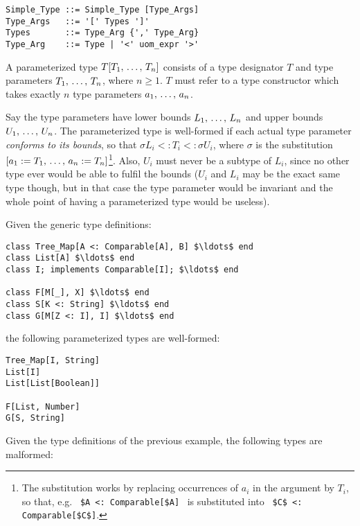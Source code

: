 \syntax\begin{lstlisting}
Simple_Type ::= Simple_Type [Type_Args]
Type_Args   ::= '[' Types ']'
Types       ::= Type_Arg {',' Type_Arg}
Type_Arg    ::= Type | '<' uom_expr '>'
\end{lstlisting}

A parameterized type $T[T_1 ,\, \ldots ,\, T_n]$ consists of a type designator $T$ and type parameters $T_1 ,\, \ldots ,\, T_n$, where $n \geq 1$. $T$ must refer to a type constructor which takes exactly $n$ type parameters $a_1 ,\, \ldots ,\, a_n$. 

Say the type parameters have lower bounds $L_1 ,\, \ldots ,\, L_n$ and upper bounds $U_1 ,\, \ldots ,\, U_n$. The parameterized type is well-formed if each actual type parameter {\em conforms to its bounds}, so that $\sigma L_i <: T_i <: \sigma U_i$, where $\sigma$ is the substitution $[a_1 := T_1 ,\, \ldots ,\, a_n := T_n]$\footnote{The substitution works by replacing occurrences of $a_i$ in the argument by $T_i$, so that, e.g. ~\lstinline[mathescape=false]!$A <: Comparable[$A]!~ is substituted into ~\lstinline!$C$ <: Comparable[$C$]!.}. Also, $U_i$ must never be a subtype of $L_i$, since no other type ever would be able to fulfil the bounds ($U_i$ and $L_i$ may be the exact same type though, but in that case the type parameter would be invariant and the whole point of having a parameterized type would be useless). 

\example
\label{example:parameterized-types}
Given the generic type definitions: 

\begin{lstlisting}
class Tree_Map[A <: Comparable[A], B] $\ldots$ end
class List[A] $\ldots$ end
class I; implements Comparable[I]; $\ldots$ end

class F[M[_], X] $\ldots$ end
class S[K <: String] $\ldots$ end
class G[M[Z <: I], I] $\ldots$ end
\end{lstlisting}

the following parameterized types are well-formed: 

\begin{lstlisting}
Tree_Map[I, String]
List[I]
List[List[Boolean]]

F[List, Number]
G[S, String]
\end{lstlisting}

\example
\label{example:parameterized-types-mal}

Given the type definitions of the previous example, the following types are malformed: 

